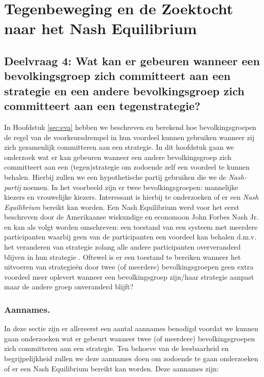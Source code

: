 \newpage
\section{Tegenbeweging en de Zoektocht naar het Nash Equilibrium}
\label{h7}

\subsection*{Deelvraag 4: Wat kan er gebeuren wanneer een bevolkingsgroep zich committeert aan een strategie en een andere bevolkingsgroep zich committeert aan een tegenstrategie?}


In Hoofdstuk \ref{sec:eva} hebben we beschreven en berekend hoe bevolkingsgroepen de regel van de voorkeursdrempel in hun voordeel kunnen gebruiken wanneer zij zich gezamenlijk committeren aan een strategie. In dit hoofdstuk gaan we onderzoek wat er kan gebeuren wanneer een andere bevolkingsgroep zich committeert aan een (tegen)strategie om zodoende zelf een voordeel te kunnen behalen. Hierbij zullen we een hypothetische partij gebruiken die we de \textit{Nash-partij} noemen. In het voorbeeld zijn er twee bevolkingsgroepen: mannelijke kiezers en vrouwelijke kiezers. Interessant is hierbij te onderzoeken of er een \textit{Nash Equilibrium} bereikt kan worden. Een Nash Equilibrium werd voor het eerst beschreven door de Amerikaanse wiskundige en economoon John Forbes Nash Jr. \citeyearpar{nash1950equilibrium} en kan als volgt worden omschreven: een toestand van een systeem met meerdere participanten waarbij geen van de participanten een voordeel kan behalen d.m.v. het veranderen van strategie zolang alle andere participanten oververanderd blijven in hun strategie \citep{christiansen2016neuroeconomics, nashprinceton}. Oftewel is er een toestand te bereiken wanneer het uitvoeren van strategie\"{e}n door twee (of meerdere) bevolkingsgroepen geen extra voordeel meer oplevert wanneer een bevolkingsgroep zijn/haar strategie aanpast maar de andere groep onveranderd blijft? 

\subsubsection*{Aannames.} \label{aannamesNash}
In deze sectie zijn er allereerst een aantal aannames benodigd voordat we kunnen gaan onderzoeken wat er gebeurt wanneer twee (of meerdere) bevolkingsgroepen zich committeren aan een strategie. Ten behoeve van de leesbaarheid en begrijpelijkheid zullen we deze aannames doen om zodoende te gaan onderzoeken of er een Nash Equilibrium bereikt kan worden. Deze aannames zijn:

